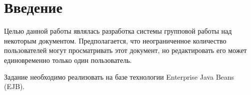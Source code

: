 \section{Введение}

Целью данной работы являлась разработка системы групповой работы над некоторым документом. Предполагается, что неограниченное количество пользователей могут просматривать этот документ, но редактировать его может единовременно только один пользователь.

Задание необходимо реализовать на базе технологии Enterprise Java Beans (EJB).

